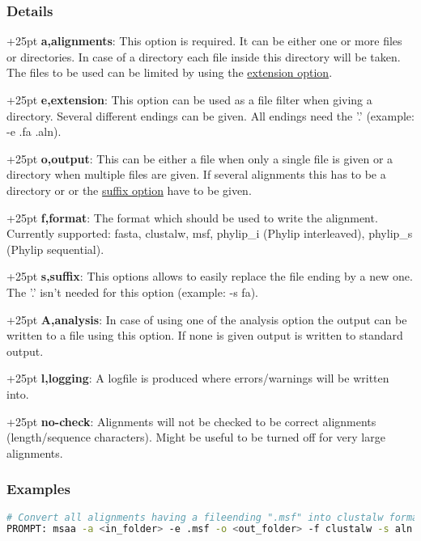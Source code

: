 \documentclass[a4paper,10pt,parskip=half]{scrartcl}
\begin{document}
\subsubsection*{Details}

\hangindent+25pt 
\textbf{a,alignments}: This option is required. It can be either one or more files or directories. In case of a directory each file inside this directory will be taken. The files to be used can be limited by using the \hyperref[extension]{extension option}.

\hangindent+25pt 
\textbf{e,extension}:\label{extension} This option can be used as a file filter when giving a directory. Several different endings can be given. All endings need the '.' (example: -e .fa .aln).

\hangindent+25pt 
\textbf{o,output}: This can be either a file when only a single file is given or a directory when multiple files are given. If several alignments this has to be a directory or or the \hyperref[change_suffix]{suffix option} have to be given. 

\hangindent+25pt 
\textbf{f,format}: The format which should be used to write the alignment. Currently supported: fasta, clustalw, msf, phylip\_i (Phylip interleaved), phylip\_s (Phylip sequential).

\hangindent+25pt 
\textbf{s,suffix}:\label{change_suffix} This options allows to easily replace the file ending by a new one. The '.' isn't needed for this option (example: -s fa). 

\hangindent+25pt 
\textbf{A,analysis}: In case of using one of the analysis option the output can be written to a file using this option. If none is given output is written to standard output.

\hangindent+25pt 
\textbf{l,logging}: A logfile is produced where errors/warnings will be written into.

\hangindent+25pt 
\textbf{no-check}: Alignments will not be checked to be correct alignments (length/sequence characters). Might be useful to be turned off for very large alignments.

\subsubsection*{Examples}
\begin{lstlisting}[language=bash,frame=none,morekeywords={PROMPT}]
# Convert all alignments having a fileending ".msf" into clustalw format, write them into a new folder and change the fileending to aln
PROMPT: msaa -a <in_folder> -e .msf -o <out_folder> -f clustalw -s aln
\end{lstlisting}
\end{document}
